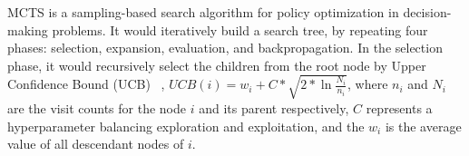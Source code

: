MCTS is a sampling-based search algorithm for policy optimization in decision-making problems. It would iteratively build a search tree, by repeating four phases: selection, expansion, evaluation, and backpropagation. In the selection phase, it would recursively select the children from the root node by Upper Confidence Bound (UCB) ~\citep{auer2002finite}, $UCB(i)=w_i+C*\sqrt{2*\ln{\frac{N_i}{n_i}}}$, where $n_i$ and $N_i$ are the visit counts for the node $i$ and its parent respectively, $C$ represents a hyperparameter balancing exploration and exploitation, and the $w_i$ is the average value of all descendant nodes of $i$.
